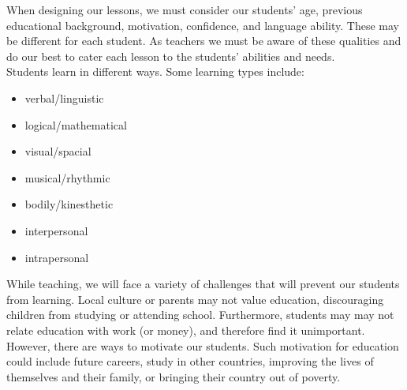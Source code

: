 \begin{figure}[h!]
\centering
\setlength\fboxsep{0pt}
\setlength\fboxrule{2pt}
\end{figure}

When designing our lessons, we must consider our students' age, previous educational background, motivation, confidence, and language ability.  These may be different for each student.  As teachers we must be aware of these qualities and do our best to cater each lesson to the students' abilities and needs.\\

Students learn in different ways.  Some learning types include: 
\begin{itemize}
\item verbal/linguistic
\item logical/mathematical
\item visual/spacial
\item musical/rhythmic
\item bodily/kinesthetic
\item interpersonal 
\item intrapersonal 
\end{itemize}



While teaching, we will face a variety of challenges that will prevent our students from learning.  Local culture or parents may not value education, discouraging children from studying or attending school.  Furthermore, students may may not relate education with work (or money), and therefore find it unimportant.  However, there are ways to motivate our students.  Such motivation for education could include future careers, study in other countries, improving the lives of themselves and their family, or bringing their country out of poverty.  

